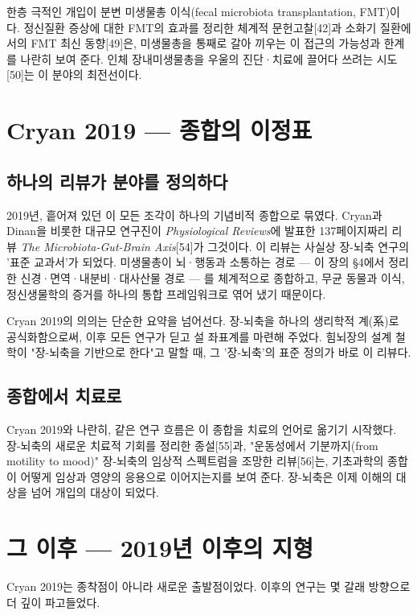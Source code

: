 \documentclass[12pt,oneside]{book}
\begin{document}
한층 극적인 개입이 분변 미생물총 이식(fecal microbiota transplantation, FMT)이다. 정신질환 증상에 대한 FMT의 효과를 정리한 체계적 문헌고찰[42]과 소화기 질환에서의 FMT 최신 동향[49]은, 미생물총을 통째로 갈아 끼우는 이 접근의 가능성과 한계를 나란히 보여 준다. 인체 장내미생물총을 우울의 진단·치료에 끌어다 쓰려는 시도[50]는 이 분야의 최전선이다.

\section{Cryan 2019 — 종합의 이정표}

\subsection{하나의 리뷰가 분야를 정의하다}

2019년, 흩어져 있던 이 모든 조각이 하나의 기념비적 종합으로 묶였다. Cryan과 Dinan을 비롯한 대규모 연구진이 \textit{Physiological Reviews}에 발표한 137페이지짜리 리뷰 \textit{The Microbiota-Gut-Brain Axis}[54]가 그것이다. 이 리뷰는 사실상 장-뇌축 연구의 '표준 교과서'가 되었다. 미생물총이 뇌·행동과 소통하는 경로 — 이 장의 §4에서 정리한 신경·면역·내분비·대사산물 경로 — 를 체계적으로 종합하고, 무균 동물과 이식, 정신생물학의 증거를 하나의 통합 프레임워크로 엮어 냈기 때문이다.

Cryan 2019의 의의는 단순한 요약을 넘어선다. 장-뇌축을 하나의 생리학적 계(系)로 공식화함으로써, 이후 모든 연구가 딛고 설 좌표계를 마련해 주었다. 힘뇌장의 설계 철학이 "장-뇌축을 기반으로 한다"고 말할 때, 그 '장-뇌축'의 표준 정의가 바로 이 리뷰다.

\subsection{종합에서 치료로}

Cryan 2019와 나란히, 같은 연구 흐름은 이 종합을 치료의 언어로 옮기기 시작했다. 장-뇌축의 새로운 치료적 기회를 정리한 종설[55]과, "운동성에서 기분까지(from motility to mood)" 장-뇌축의 임상적 스펙트럼을 조망한 리뷰[56]는, 기초과학의 종합이 어떻게 임상과 영양의 응용으로 이어지는지를 보여 준다. 장-뇌축은 이제 이해의 대상을 넘어 개입의 대상이 되었다.

\section{그 이후 — 2019년 이후의 지형}

Cryan 2019는 종착점이 아니라 새로운 출발점이었다. 이후의 연구는 몇 갈래 방향으로 더 깊이 파고들었다.
\end{document}
